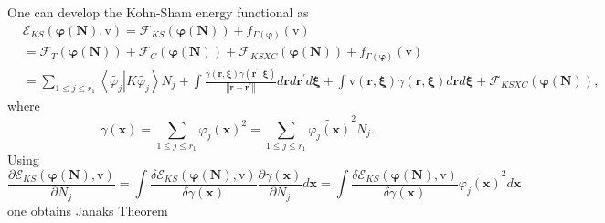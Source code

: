 \documentclass[aps,preprint]{revtex4}%
\begin{document}
One can develop the Kohn-Sham energy functional as%
\begin{align}
&  \mathcal{E}_{KS}\left(  \mathbf{\varphi}\left(  \mathbf{N}\right)
\mathbf{,}\mathrm{v}\right)  =\mathcal{F}_{KS}\left(  \mathbf{\varphi}\left(
\mathbf{N}\right)  \right)  +f_{\Gamma\left(  \mathbf{\varphi}\right)
}\left(  \mathrm{v}\right) \nonumber\\
&  =\mathcal{F}_{T}\left(  \mathbf{\varphi}\left(  \mathbf{N}\right)  \right)
+\mathcal{F}_{C}\left(  \mathbf{\varphi}\left(  \mathbf{N}\right)  \right)
+\mathcal{F}_{KSXC}\left(  \mathbf{\varphi}\left(  \mathbf{N}\right)  \right)
+f_{\Gamma\left(  \mathbf{\varphi}\right)  }\left(  \mathrm{v}\right)
\nonumber\\
&  =\sum_{1\leq j\leq r_{1}}\left\langle \widetilde{\varphi_{j}}\left\vert
K\widetilde{\varphi_{j}}\right.  \right\rangle N_{j}+\int\frac{\gamma\left(
\mathbf{r,\xi}\right)  \gamma\left(  \mathbf{r}^{\prime}\mathbf{,\xi}\right)
}{\left\Vert \mathbf{r-r}^{\prime}\right\Vert }d\mathbf{r}d\mathbf{r}^{\prime
}d\mathbf{\xi}+\int\mathrm{v}\left(  \mathbf{r,\xi}\right)  \gamma\left(
\mathbf{r,\xi}\right)  d\mathbf{r}d\mathbf{\xi}+\mathcal{F}_{KSXC}\left(
\mathbf{\varphi}\left(  \mathbf{N}\right)  \right)  ,
\end{align}
where
\begin{equation}
\gamma\left(  \mathbf{x}\right)  =\sum_{1\leq j\leq r_{1}}\varphi_{j}\left(
\mathbf{x}\right)  ^{2}=\sum_{1\leq j\leq r_{1}}\widetilde{\varphi_{j}\left(
\mathbf{x}\right)  }^{2}N_{j}.
\end{equation}
Using
\begin{equation}
\frac{\partial\mathcal{E}_{KS}\left(  \mathbf{\varphi}\left(  \mathbf{N}%
\right)  ,\mathrm{v}\right)  }{\partial N_{j}}=\int\frac{\delta\mathcal{E}%
_{KS}\left(  \mathbf{\varphi}\left(  \mathbf{N}\right)  ,\mathrm{v}\right)
}{\delta\gamma\left(  \mathbf{x}\right)  }\frac{\partial\gamma\left(
\mathbf{x}\right)  }{\partial N_{j}}d\mathbf{x=}\int\frac{\delta
\mathcal{E}_{KS}\left(  \mathbf{\varphi}\left(  \mathbf{N}\right)
,\mathrm{v}\right)  }{\delta\gamma\left(  \mathbf{x}\right)  }\widetilde
{\varphi_{j}\left(  \mathbf{x}\right)  }^{2}d\mathbf{x} \label{DerNj}%
\end{equation}
one obtains Janaks Theorem
\end{document}
